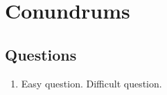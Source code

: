 \documentclass[a4paper]{book}
\newcommand{\itemstar}{\moditem{\textbf{*}}}
\begin{document}
\chapter{Conundrums}

\kant[1]

\section{Questions}

\begin{enumerate}[labelindent=0pt,labelwidth=\widthof{88.8.\ },label=\textbf{\thechapter.\arabic*.},leftmargin=!,ref=\thechapter.\arabic*]
\item Easy question.
\itemstar Difficult question.
\end{enumerate}
\end{document}
